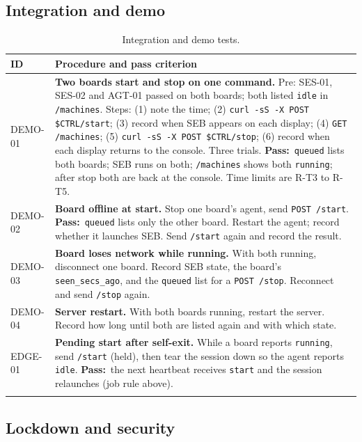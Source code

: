 \documentclass[11pt]{article}
\newcommand{\pass}{\textbf{Pass:}\ }
\begin{document}
\subsection{Integration and demo}

\begin{longtable}{@{}p{}p{}@{}}
\toprule
\textbf{ID} & \textbf{Procedure and pass criterion} \\
\midrule
\endhead
DEMO-01 & \textbf{Two boards start and stop on one command.}
Pre: SES-01, SES-02 and AGT-01 passed on both boards; both listed \texttt{idle} in \texttt{/machines}.
Steps: (1) note the time; (2) \texttt{curl -sS -X POST \$CTRL/start}; (3) record when SEB appears on each display; (4) \texttt{GET /machines}; (5) \texttt{curl -sS -X POST \$CTRL/stop}; (6) record when each display returns to the console. Three trials.
\pass \texttt{queued} lists both boards; SEB runs on both; \texttt{/machines} shows both \texttt{running}; after stop both are back at the console. Time limits are R-T3 to R-T5. \\
DEMO-02 & \textbf{Board offline at start.} Stop one board's agent, send \texttt{POST /start}. \pass \texttt{queued} lists only the other board. Restart the agent; record whether it launches SEB. Send \texttt{/start} again and record the result. \\
DEMO-03 & \textbf{Board loses network while running.} With both running, disconnect one board. Record SEB state, the board's \texttt{seen\_secs\_ago}, and the \texttt{queued} list for a \texttt{POST /stop}. Reconnect and send \texttt{/stop} again. \\
DEMO-04 & \textbf{Server restart.} With both boards running, restart the server. Record how long until both are listed again and with which state. \\
EDGE-01 & \textbf{Pending start after self-exit.} While a board reports \texttt{running}, send \texttt{/start} (held), then tear the session down so the agent reports \texttt{idle}. \pass the next heartbeat receives \texttt{start} and the session relaunches (job rule above). \\
\bottomrule
\caption{Integration and demo tests.}\label{tab:demo}
\end{longtable}

\subsection{Lockdown and security}
\end{document}
